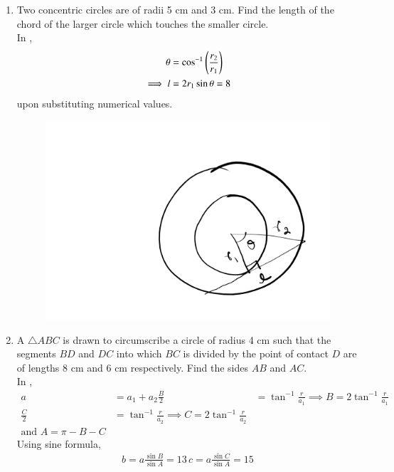 \begin{enumerate}[label=\thesubsection.\arabic*,ref=\thesubsection.\theenumi]
\begin{figure}[H]
\begin{center}
	\end{center}
	\caption{}
	\label{fig:ncert-circ-5}	
\end{figure}
%
\item  Two concentric circles are of radii 5 cm and 3 cm. Find the length of the chord of the larger circle which touches the smaller circle.
\\
\solution
	In , 
\begin{align}
	\theta &= \cos^{-1}\left(\frac{r_2}{r_1}\right)
	\\
\implies	l &= 2r_1\sin \theta = 8
\end{align}
upon substituting numerical values.
\begin{figure}[H]
	\begin{center}
		{\includegraphics[width=0.6\columnwidth]{figs/ncert/circle/6.png}}
	\end{center}
	\caption{}
	\label{fig:ncert-circ-6}	
\end{figure}
%
\item A $\triangle ABC$ is drawn to circumscribe a circle of radius 4 cm such that the segments $BD$ and $DC$ into which $BC$ is divided by the point of contact $D$ are of lengths 8 cm and 6 cm respectively. Find the sides $AB$ and $AC$.
\\
\solution
	In , 
\begin{align}
	a &= a_1+a_2
	\frac{B}{2} &= \tan^{-1}\frac{r}{a_1}
	\implies B = 2\tan^{-1}\frac{r}{a_1}
	\\
	\frac{C}{2} &= \tan^{-1}\frac{r}{a_2}
	\implies C = 2\tan^{-1}\frac{r}{a_2}
	\\
	\text{and } A = \pi - B-C
\end{align}
Using sine formula,
\begin{align}
	b = a\frac{\sin B}{\sin A}=13\,
	c = a\frac{\sin C}{\sin A}=15
\end{align}
\begin{figure}[H]
	\begin{center}

\end{center}
\end{figure}
\end{enumerate}
